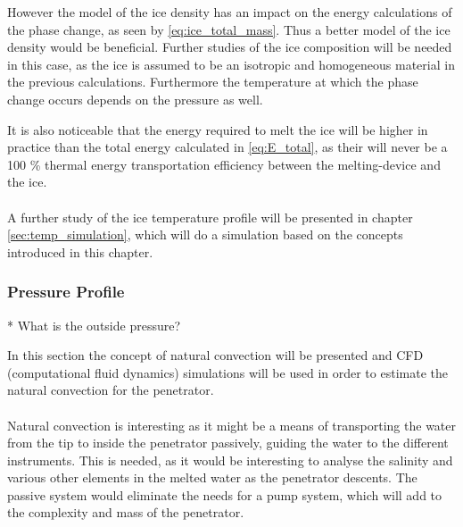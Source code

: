 However the model of the ice density has an impact on the energy calculations of the phase change, as seen by \eqref{eq:ice_total_mass}. Thus a better model of the ice density would be beneficial. Further studies of the ice composition will be needed in this case, as the ice is assumed to be an isotropic and homogeneous material in the previous calculations. Furthermore the temperature at which the phase change occurs depends on the pressure as well.

It is also noticeable that the energy required to melt the ice will be higher in practice than the total energy calculated in \eqref{eq:E_total}, as their will never be a 100 \% thermal energy transportation efficiency between the melting-device and the ice.
\\
\\
A further study of the ice temperature profile will be presented in chapter \ref{sec:temp_simulation}, which will do a simulation based on the concepts introduced in this chapter.

\subsubsection{Pressure Profile}

* What is the outside pressure?



\label{sec:water_convection}

In this section the concept of natural convection will be presented and CFD (computational fluid dynamics) simulations will be used in order to estimate the natural convection for the penetrator.
\\
\\
Natural convection is interesting as it might be a means of transporting the water from the tip to inside the penetrator passively, guiding the water to the different instruments.  This is needed, as it would be interesting to analyse the salinity and various other elements in the melted water as the penetrator descents. The passive system would eliminate the needs for a pump system, which will add to the complexity and mass of the penetrator.

